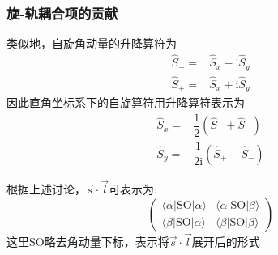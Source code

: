 \frame
{
	\frametitle{旋-轨耦合项的贡献}
类似地，自旋角动量的升降算符为
\begin{displaymath}
	\begin{aligned}
		\hat S_-=&\hat S_x-\mathrm{i}\hat S_y\\
		\hat S_+=&\hat S_x+\mathrm{i}\hat S_y
	\end{aligned}
\end{displaymath}
因此直角坐标系下的自旋算符用升降算符表示为
\begin{displaymath}
	\begin{aligned}
		\hat S_x=&\dfrac12(\hat S_++\hat S_-)\\
		\hat S_y=&\dfrac1{2\mathrm{i}}(\hat S_+-\hat S_-)
	\end{aligned}
\end{displaymath}

根据上述讨论，$\vec{s}\cdot\vec{l}$可表示为:
\begin{displaymath}
	\begin{pmatrix}
		\langle\alpha|\mathrm{SO}|\alpha\rangle &\langle\alpha|\mathrm{SO}|\beta\rangle \\
		\langle\beta|\mathrm{SO}|\alpha\rangle &\langle\beta|\mathrm{SO}|\beta\rangle
	\end{pmatrix}
\end{displaymath}
这里$\mathrm{SO}$略去角动量下标，表示将$\vec s\cdot\vec l$展开后的形式
}

